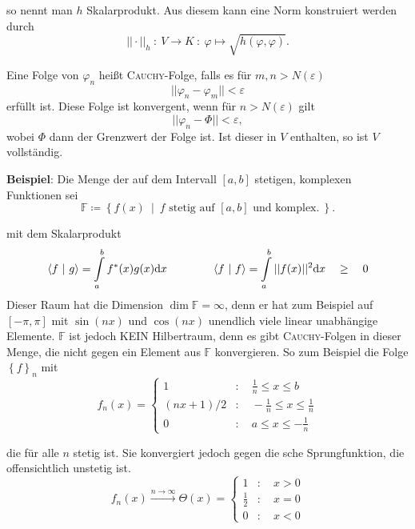 \documentclass[a4paper,12pt,portrait]{book}
\numberwithin{equation}{section}
\begin{document}
so nennt man $h$ Skalarprodukt. Aus diesem kann eine Norm konstruiert werden durch
\begin{equation*}
||\cdot||_h \ :\ V\rightarrow K \ :\ \varphi \mapsto \sqrt{h(\varphi,\varphi)}.
\end{equation*}

Eine Folge von $\varphi_n$ heißt \textsc{Cauchy}-Folge, falls es für $m,n>N(\varepsilon)$
\begin{equation*}
||\varphi_n-\varphi_m|| < \varepsilon
\end{equation*}
erfüllt ist. Diese Folge ist konvergent, wenn für $n>N(\varepsilon)$ gilt
\begin{equation*}
||\varphi_n - \Phi||<\varepsilon,
\end{equation*}
wobei $\Phi$ dann der Grenzwert der Folge ist. Ist dieser in $V$ enthalten, so ist $V$ vollständig.\\ \linebreak

\textbf{Beispiel}: Die Menge der auf dem Intervall $[a,b]$ stetigen, komplexen Funktionen sei
\begin{equation*}
\mathbb{F}\coloneqq \left\lbrace f(x)\ \middle| \ f \text{ stetig auf } [a,b] \text{ und komplex.}\ \right\rbrace.
\end{equation*}

mit dem Skalarprodukt
\begin{equation*}
\left\langle f \ \middle| \ g\right\rangle=\int\limits_a^b f^*(x)g(x)\mathrm{d}x\qquad\qquad \left\langle f \ \middle| \ f\right\rangle=\int\limits_a^b ||f(x)||^2\mathrm{d}x \quad\geq\quad 0
\end{equation*}
Dieser Raum hat die Dimension $\dim\mathbb{F}=\infty$, denn er hat zum Beispiel auf $\left[-\pi,\pi\right]$ mit $\sin(nx)$ und $\cos(nx)$ unendlich viele linear unabhängige Elemente. $\mathbb{F}$ ist jedoch KEIN Hilbertraum, denn es gibt \textsc{Cauchy}-Folgen in dieser Menge, die nicht gegen ein Element aus $\mathbb{F}$ konvergieren. So zum Beispiel die Folge $\left\lbrace f\right\rbrace_n$ mit
\begin{equation*}
f_n(x)= 
\begin{cases}
1 & : \quad \frac{1}{n}\leq x \leq b \\
(nx+1)/2 &  : \quad  -\frac{1}{n} \leq x \leq \frac{1}{n} \\
0 & : \quad a\leq x \leq -\frac{1}{n}
\end{cases}
\end{equation*}

die für alle $n$ stetig ist. Sie konvergiert jedoch gegen die 
sche Sprungfunktion, die offensichtlich unstetig ist.
\begin{equation*}
f_n(x) \xrightarrow{n\rightarrow\infty} \Theta (x) = 
\begin{cases}
1 & :\quad x > 0 \\
\frac{1}{2} & :\quad x = 0 \\
0 & :\quad x < 0
\end{cases}
\end{equation*}
\end{document}
